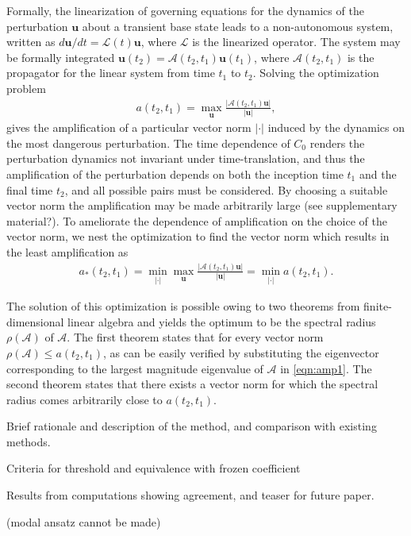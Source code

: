 \documentclass[letterpaper,10pt,prl,twocolumn,aps,reprint,superscriptaddress]{revtex4-1}
\newcommand{\bu}{\boldsymbol{u}}
\newcommand{\cL}{\boldsymbol{\mathcal{L}}}
\newcommand{\cA}{\boldsymbol{\mathcal{A}}}
\begin{document}
Formally, the linearization of governing equations for the dynamics of the perturbation $\bu$ about a transient base state leads to a non-autonomous system, written as ${d\bu}/{dt} = \cL(t)\bu$, where $\cL$ is the linearized operator. 
The system may be formally integrated $\bu (t_2) = \cA(t_2, t_1) \bu(t_1)$, where $\cA(t_2, t_1)$ is the propagator for the linear system from time $t_1$ to $t_2$. Solving the optimization problem 
\begin{align}
a(t_2, t_1) = \max_{\bu} \frac{| \cA(t_2, t_1) \bu|}{|\bu|}, \label{eqn:amp1}
\end{align}
gives the amplification of a particular vector norm $|\cdot|$ induced by the dynamics on the most dangerous perturbation. 
The time dependence of $C_0$ renders the perturbation dynamics not invariant under time-translation, and thus the amplification of the perturbation depends on both the inception time $t_1$ and the final time $t_2$, and all possible pairs must be considered. 
By choosing a suitable vector norm the amplification may be made arbitrarily large (see supplementary material?). 
To ameliorate the dependence of amplification on the choice of the vector norm, we nest the optimization to find the vector norm which results in the least amplification as
\begin{align}
a_*(t_2, t_1) = \min_{|\cdot|} \max_{\bu} \frac{| \cA(t_2, t_1) \bu|}{|\bu|} = \min_{|\cdot|} a(t_2, t_1). \label{eqn:amp2}
\end{align}

The solution of this optimization is possible owing to two theorems from finite-dimensional linear algebra and yields the optimum to be the spectral radius $\rho(\cA)$ of $\cA$. 
The first theorem states that for every vector norm $\rho(\cA) \le a(t_2,t_1)$, as can be easily verified by substituting the eigenvector corresponding to the largest magnitude eigenvalue of $\cA$ in \eqref{eqn:amp1}. 
The second theorem states that there exists a vector norm for which the spectral radius comes arbitrarily close to $a(t_2,t_1)$. 

\vspace{1cm}
Brief rationale and description of the method, and comparison with existing methods.

Criteria for threshold and equivalence with frozen coefficient

Results from computations showing agreement, and teaser for future paper.

(modal ansatz cannot be made)


% 
\end{document}
